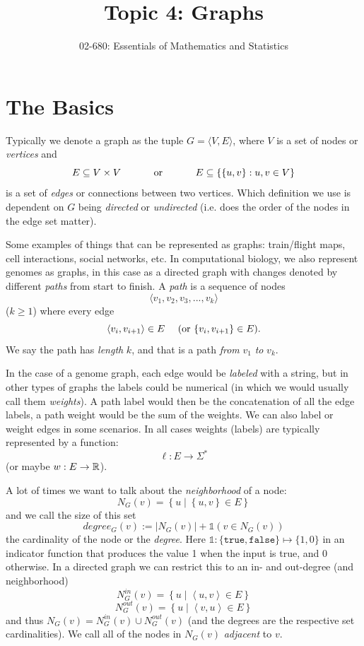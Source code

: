 


\title{Topic 4: Graphs}
\author{02-680: Essentials of Mathematics and Statistics}


\maketitle

\section{The Basics}
Typically we denote a graph as the tuple $G=\langle V, E\rangle$, 
where $V$ is a set of nodes or \emph{vertices} and 
\[E\subseteq V\times V \textnormal{\hspace{3em} or \hspace{3em}} E\subseteq \left\{\left\{u,v\right\} : u,v \in V\right\}\] 
is a set of \emph{edges} or connections between two vertices.
Which definition we use is dependent on $G$ being \emph{directed} or \emph{undirected} (i.e. does the order of the nodes in the edge set matter).  

Some examples of things that can be represented as graphs: train/flight maps, cell interactions, social networks, etc. 
In computational biology, we also represent genomes as graphs, in this case as a directed graph with changes denoted by different \emph{paths} from start to finish. 
A \textit{path} is a sequence of nodes \[\langle v_1, v_2, v_3,...,v_k \rangle\] ($k\ge 1$) where every edge \[\langle v_{i}, v_{i+1}\rangle \in E\textnormal{\hspace{1em} (or  }\{ v_{i}, v_{i+1}\} \in E\textnormal{).}\]
We say the path has \emph{length} $k$, and that is a path \textit{from} $v_1$ \textit{to} $v_k$.

In the case of a genome graph, each edge would be \emph{labeled} with a string, but in other types of graphs the labels could be numerical 
(in which we would usually call them \textit{weights}).
A path label would then be the concatenation of all the edge labels, a path weight would be the sum of the weights. 
We can also label or weight edges in some scenarios. 
In all cases weights (labels) are typically represented by a function:
\[\ell: E \rightarrow \Sigma^* \]
(or maybe $w: E \rightarrow \operatorname{\mathbb{R}}$).

A lot of times we want to talk about the \emph{neighborhood} of a node: 
\[N_G(v) = \left\{ u \mid \left\{u,v\right\} \in E\right\}\]
and we call the size of this set \[degree_G(v) := \left|N_G(v)\right| + \mathds{1}\left(v \in N_G\left(v\right)\right)\] the cardinality of the node or the \emph{degree}. 
Here $\mathds{1}: \{\texttt{true},\texttt{false}\}\mapsto\{1,0\}$ in an indicator function that produces the value 1 when the input is true, and 0 otherwise.  
In a directed graph we can restrict this to an in- and out-degree (and neighborhood)
\[N^{in}_G(v) = \left\{ u \mid \left\langle u,v\right\rangle \in E\right\}\]
\[N^{out}_G(v) = \left\{ u \mid \left\langle v,u\right\rangle \in E\right\}\]
and thus $N_G(v) = N^{in}_G(v) \cup N^{out}_G(v)$ (and the degrees are the respective set cardinalities). 
We call all of the nodes in $N_G(v)$ \emph{adjacent} to $v$. 

